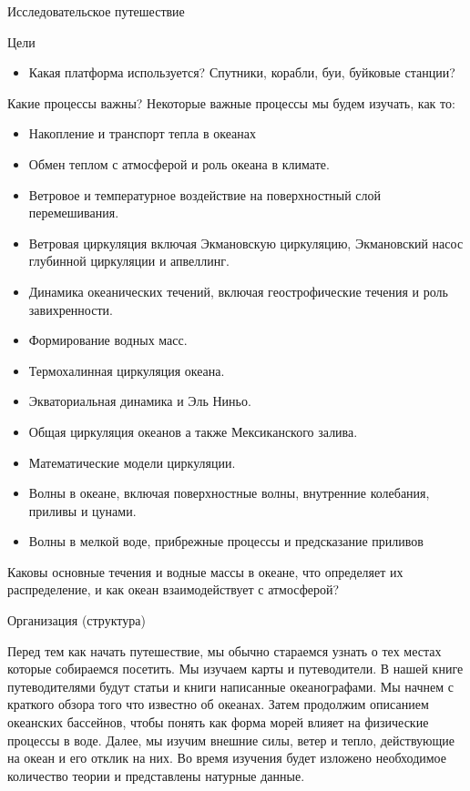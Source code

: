 \begin{chapter}{Исследовательское путешествие}
\begin{section}{Цели}
\begin{itemize}
\item
Какая платформа используется? Спутники, корабли, буи, буйковые станции?
\end{itemize}

Какие процессы важны? Некоторые важные процессы мы будем изучать, как то:
\begin{itemize}
\item
Накопление и транспорт тепла в океанах 

\item
Обмен теплом с атмосферой и роль океана в климате. 

\item
Ветровое и температурное воздействие на поверхностный слой перемешивания. 

\item
Ветровая циркуляция включая Экмановскую циркуляцию, Экмановский насос 
глубинной циркуляции и апвеллинг. 

\item
Динамика океанических течений, включая геострофические течения и роль 
завихренности. 

\item
Формирование водных масс. 

\item
Термохалинная циркуляция океана. 

\item
Экваториальная динамика и Эль Ниньо. 

\item
Общая циркуляция океанов а также Мексиканского залива. 

\item
Математические модели циркуляции. 

\item
Волны в океане, включая поверхностные волны, внутренние колебания, приливы 
и цунами. 

\item
Волны в мелкой воде, прибрежные процессы и предсказание приливов
\end{itemize}

Каковы основные течения и водные массы в океане, что определяет их 
распределение, и как океан взаимодействует с атмосферой?
\end{section}

\begin{section}{Организация (структура)}

Перед тем как начать путешествие, мы обычно стараемся узнать о тех местах 
которые собираемся посетить. Мы изучаем карты и путеводители. В нашей книге 
путеводителями будут статьи и книги написанные океанографами. Мы начнем 
с краткого обзора того что известно об океанах. Затем продолжим описанием 
океанских бассейнов, чтобы понять как форма морей влияет на физические 
процессы в воде. Далее, мы изучим внешние силы, ветер и тепло, действующие 
на океан и его отклик на них. Во время изучения будет изложено необходимое 
количество теории и представлены натурные данные.


\end{section}
\end{chapter}

